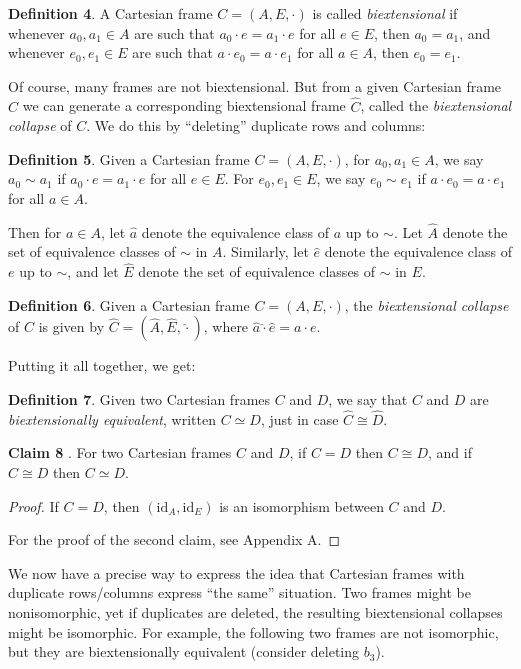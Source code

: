 \documentclass{article}
\begin{document}
\bigskip
\noindent \textbf{Definition 4}.
A Cartesian frame $C= (A, E, \cdot)$ is called \emph{biextensional} if whenever $a_0, a_1 \in A$ are such that $a_0 \cdot e = a_1 \cdot e$ for all $e \in E$, then $a_0 = a_1$, and whenever $e_0, e_1 \in E$ are such that $a \cdot e_0 = a \cdot e_1$ for all $a \in A$, then $e_0 = e_1$.

\bigskip
\noindent Of course, many frames are not biextensional.
But from a given Cartesian frame $C$ we can generate a corresponding biextensional frame $\hat{C}$, called the \emph{biextensional collapse} of $C$.
We do this by ``deleting'' duplicate rows and columns:

\bigskip
\noindent \textbf{Definition 5}.
Given a Cartesian frame $C = (A, E, \cdot)$, for $a_0, a_1 \in A$, we say $a_0 \sim a_1$ if $a_0 \cdot e = a_1 \cdot e$ for all $e \in E$. For $e_0, e_1 \in E$, we say $e_0 \sim e_1$ if $a \cdot e_0 = a \cdot e_1$ for all $a \in A$.

Then for $a \in A$, let $\hat{a}$ denote the equivalence class of $a$ up to $\sim$. 
Let $\hat{A}$ denote the set of equivalence classes of $\sim$ in $A$.
Similarly, let $\hat{e}$ denote the equivalence class of $e$ up to $\sim$, and let $\hat{E}$ denote the set of equivalence classes of $\sim$ in $E$.

\bigskip
\noindent \textbf{Definition 6}.
Given a Cartesian frame $C = (A, E, \cdot)$, the \emph{biextensional collapse} of $C$ is given by $\hat{C} = (\hat{A}, \hat{E}, \hat{\cdot})$, where $\hat{a} \hat{\cdot} \hat{e} = a \cdot e$.

\bigskip
\noindent Putting it all together, we get:

\bigskip
\noindent \textbf{Definition 7}.
Given two Cartesian frames $C$ and $D$, we say that $C$ and $D$ are \emph{biextensionally equivalent}, written $C \simeq D$, just in case $\hat{C} \cong \hat{D}$.

\bigskip
\noindent \textbf{Claim 8} \label{claim:isothenbiex}.
For two Cartesian frames $C$ and $D$, if $C = D$ then $C \cong D$, and if $C \cong D$ then $C \simeq D$.

\begin{proof}
If $C = D$, then $(\text{id}_A, \text{id}_E)$ is an isomorphism between $C$ and $D$.

For the proof of the second claim, see Appendix A.
\end{proof}

\noindent We now have a precise way to express the idea that Cartesian frames with duplicate rows/columns express ``the same'' situation.
Two frames might be nonisomorphic, yet if duplicates are deleted, the resulting biextensional collapses might be isomorphic. For example, the following two frames are not isomorphic, but they are biextensionally equivalent (consider deleting $b_{3}$).
\end{document}
